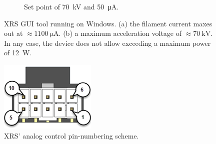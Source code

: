 \begin{figure}
\begin{subfigure}{.3\textwidth}
            \caption[Set point of \qty{70}{kV} and \qty{50}{\micro\ampere}]{Set point of \qty{70}{kV} and \qty{50}{\micro\ampere}.}%
            \label{subfig:12WattController 70kV}
        \end{subfigure}
        \caption[XRS GUI tool running on Windows]{XRS GUI tool running on Windows. (a) the filament current maxes out at \(\approx \qty{1100}{\micro\ampere}\). (b) a maximum acceleration voltage of \(\approx\qty{70}{\kilo\volt}\). In any case, the device does not allow exceeding a maximum power of \qty{12}{\watt}.}%
        \label{fig:12WattController 10kV and 70kV}
    \end{figure}
    \newpage
    \begin{figure}[t]
        \centering
        \includegraphics[width=.3\textwidth]{electronics/datasheets/XRS_10pin_male.png}
        \caption[XRS' analog control pin numbering scheme.]{XRS' analog control pin-numbering scheme.}%
        \label{fig:10 pin numbering scheme}
    \end{figure}